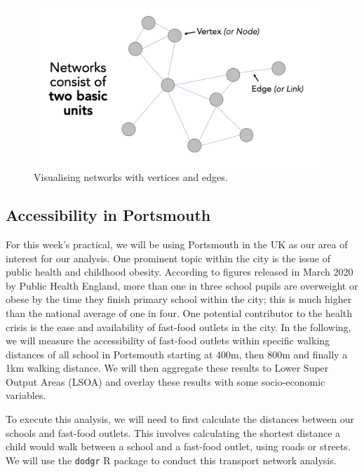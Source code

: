 \documentclass[
  letterpaper,
  DIV=11,
  numbers=noendperiod]{scrreprt}
\begin{document}
\begin{figure}

{\centering \includegraphics[width=4.27in,height=\textheight]{images/w08/network-graph.png}

}

\caption{\label{fig-ntx-network-graph-example}Visualising networks with
vertices and edges.}

\end{figure}

\hypertarget{accessibility-in-portsmouth}{%
\subsection{Accessibility in
Portsmouth}\label{accessibility-in-portsmouth}}

For this week's practical, we will be using Portsmouth in the UK as our
area of interest for our analysis. One prominent topic within the city
is the issue of public health and childhood obesity. According to
figures released in March 2020 by Public Health England, more than one
in three school pupils are overweight or obese by the time they finish
primary school within the city; this is much higher than the national
average of one in four. One potential contributor to the health crisis
is the ease and availability of fast-food outlets in the city. In the
following, we will measure the accessibility of fast-food outlets within
specific walking distances of all school in Portsmouth starting at 400m,
then 800m and finally a 1km walking distance. We will then aggregate
these results to Lower Super Output Areas (LSOA) and overlay these
results with some socio-economic variables.

To execute this analysis, we will need to first calculate the distances
between our schools and fast-food outlets. This involves calculating the
shortest distance a child would walk between a school and a fast-food
outlet, using roads or streets. We will use the \texttt{dodgr} R package
to conduct this transport network analysis.
\end{document}
